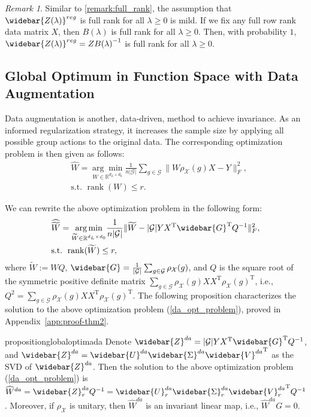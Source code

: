 \documentclass{article}
\newcommand{\T}{\mathrm{T}}
\newcommand{\G}{\mathcal{G}}
\theoremstyle{plain}
\theoremstyle{definition}
\theoremstyle{remark}
\newtheorem{remark}[theorem]{Remark}
\theoremstyle{remark}
\begin{document}
\begin{remark}
  Similar to \autoref{remark:full_rank}, the assumption that $\widebar{Z(\lambda)}^{reg}$ is full rank for all $\lambda \geq 0$ is mild. If we fix any full row rank data matrix $X$, then $B(\lambda)$ is full rank for all $\lambda \geq 0$. Then, with probability $1$, $\widebar{Z(\lambda)}^{reg} = Z {B(\lambda)}^{-1}$ is full rank for all $\lambda \geq 0$.
\end{remark}
 
\subsection{Global Optimum in Function Space with Data Augmentation}

Data augmentation is another, data-driven, method to achieve invariance. 
As an informed regularization strategy, it increases the sample size by applying all possible group actions to the original data. 
The corresponding optimization problem is then given as follows: 
\begin{align} \label{da_opt_problem}
  & \widehat{W} = \underset{W \in \mathbb{R}^{d_L \times d_0}}{\arg \min} \frac{1}{n|\G|} \sum_{g \in \G} \|W\rho_{\mathcal{X}}(g)X - Y\|_F^2, \nonumber \\
  & \text{s.t. } \operatorname*{rank}(W) \leq r.
\end{align}

We can rewrite the above optimization problem in the following form: 
\begin{align}
  & \widehat{\widetilde{W}} = \underset{\widetilde{W} \in \mathbb{R}^{d_L \times d_0}}{\arg \min} \frac{1}{n|\G|} \|\widetilde{W} - |\mathcal{G|}Y X^{\T} \widebar{G}^{\T} Q^{-1} \|_F^2, \nonumber \\
  & \text{s.t. } \operatorname*{rank}(\widetilde{W}) \leq r,
\end{align}
where $\widetilde{W} := WQ$, $\widebar{G} = \frac{1}{|\G|} \sum_{g \in \G} \rho_{\mathcal{X}}(g)$, and $Q$ is the square root of the symmetric positive definite matrix $\sum_{g \in \G} \rho_{\mathcal{X}}(g) X X^{\T} \rho_{\mathcal{X}}(g)^{\T}$, i.e., $Q^2 = \sum_{g \in \G} \rho_{\mathcal{X}}(g) X X^{\T} \rho_{\mathcal{X}}(g)^{\T}$. The following proposition characterizes the solution to the above optimization problem (\ref{da_opt_problem}), proved in Appendix~\ref{app:proof-thm2}.

\begin{restatable}{proposition}{globaloptimada}
  \label{global_optima_da}
    Denote $\widebar{Z}^{da} = |\mathcal{G|}Y X^{\T} \widebar{G}^{\T} Q^{-1}$, and $\widebar{Z}^{da} = \widebar{U}^{da} \widebar{\Sigma}^{da} {\widebar{V}^{da}}^{\T}$ as the SVD of $\widebar{Z}^{da}$. Then the solution to the above optimization problem (\ref{da_opt_problem}) is $\widehat{W}^{da} = \widebar{Z}^{da}_r Q^{-1} = \widebar{U}_r^{da} \widebar{\Sigma}_r^{da}{\widebar{V}_r^{da}}^{\T} Q^{-1}$. Moreover, if $\rho_{\mathcal{X}}$ is unitary, then $\widehat{W}^{da}$ is an invariant linear map, i.e., $\widehat{W}^{da} G = 0$.
\end{restatable} 
\end{document}
